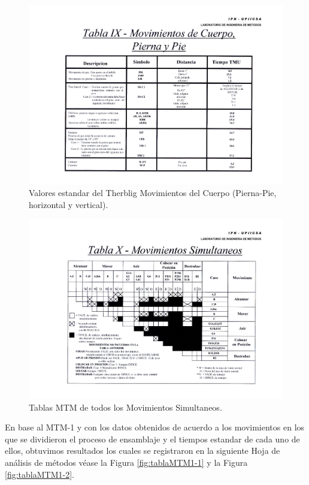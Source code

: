 \begin{figure}[H]
    \centering
    \includegraphics[scale=0.35]{15/img/tabla9MovimientoCuerpoPie.pdf}
    \caption{Valores estandar del Therblig Movimientos del Cuerpo (Pierna-Pie, horizontal y vertical).}
    \label{fig:tabla9MovimietoCuerpoPie}
\end{figure}

\begin{figure}[H]
    \centering
    \includegraphics[scale=0.35]{15/img/tabla10MovimientoSimultaneo.pdf}
    \caption{Tablas MTM de todos los Movimientos Simultaneos.}
    \label{fig:tabla10MovimietnosSimultaneo}
\end{figure}

En base al MTM-1 y con los datos obtenidos de acuerdo a los movimientos en los que se dividieron el proceso de ensamblaje y el tiempos estandar de cada uno de ellos, obtuvimos resultados los cuales se registraron en la siguiente Hoja de análisis de métodos véase la Figura \ref{fig:tablaMTM1-1} y la Figura \ref{fig:tablaMTM1-2}.

